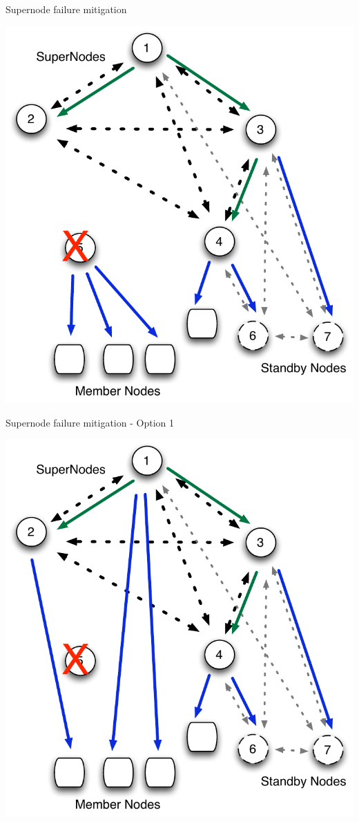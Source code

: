 \documentclass{beamer}
\begin{document}
\begin{frame}{Supernode failure mitigation}

\includegraphics[scale=.5]{Node-comm-trans1.pdf}


\end{frame}

\begin{frame}{Supernode failure mitigation - Option 1}

\includegraphics[scale=.5]{Node-comm-redist1.pdf}


\end{frame}
\end{document}
